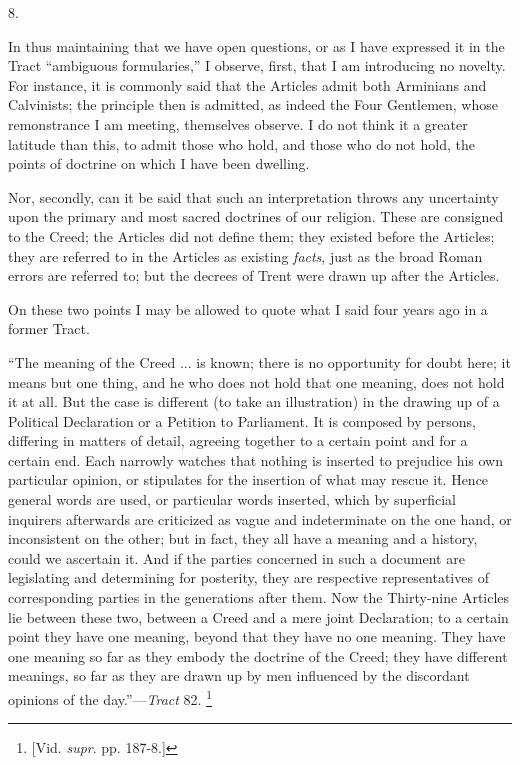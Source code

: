 8.

In thus maintaining that we have open questions,
or as I have expressed it in the Tract ``ambiguous formularies,'' I
observe, first, that I am introducing no novelty. For instance, it is
commonly said that the Articles admit both Arminians and Calvinists;
the principle then is admitted, as indeed the Four Gentlemen, whose
remonstrance I am meeting, themselves observe. I do not think it a
greater latitude than this, to admit those who hold, and those who do
not hold, the points of doctrine on which I have been dwelling.

Nor, secondly, can it be said that such an
interpretation throws any uncertainty upon the primary and most sacred
doctrines of our religion. These are consigned to the Creed; the
Articles did not define them; they existed before the Articles; they
are referred to in the Articles as existing \emph{facts}, just as the
broad Roman errors are referred to; but the decrees of Trent
were drawn up after the Articles.

On these two points I may be allowed to quote
what I said four years ago in a former Tract.

``The
meaning of the Creed ... is known; there is no opportunity for doubt
here; it means but one thing, and he who does not hold that one
meaning, does not hold it at all. But the case is different (to take
an illustration) in the drawing up of a Political Declaration or a
Petition to Parliament. It is composed by persons, differing in
matters of detail, agreeing together to a certain point and for a
certain end. Each narrowly watches that nothing is inserted to
prejudice his own particular opinion, or stipulates for the insertion
of what may rescue it. Hence general words are used, or particular
words inserted, which by superficial inquirers afterwards are
criticized as vague and indeterminate on the one hand, or inconsistent
on the other; but in fact, they all have a meaning and a history,
could we ascertain it. And if the parties concerned in such a document
are legislating and determining for posterity, they are respective
representatives of corresponding parties in the generations after
them. Now the Thirty-nine Articles lie between these two, between a
Creed and a mere joint Declaration; to a certain point they have one
meaning, beyond that they have no one meaning. They have one meaning
so far as they embody the doctrine of the Creed; they have different
meanings, so far as they are drawn up by men influenced by the
discordant opinions of the day.''—\emph{Tract} 82. \footnote{[Vid. \emph{supr}. pp. 187-8.]}

